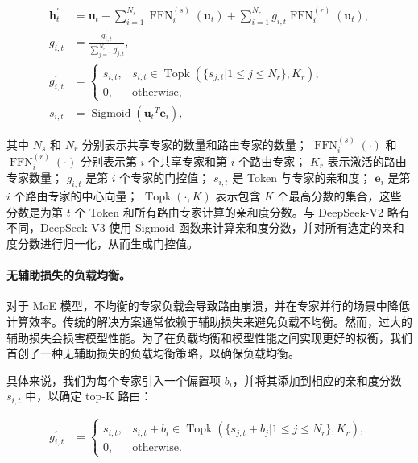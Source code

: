 \documentclass[lang=cn,a4paper,newtx]{elegantpaper}
\newcommand{\dsvii}{DeepSeek-V2}
\newcommand{\dsviii}{DeepSeek-V3}
\begin{document}
\begin{align}
    \mathbf{h}_{t}^{\prime} & = \mathbf{u}_{t} + \sum_{i=1}^{N_{s}} {\operatorname{FFN}^{(s)}_{i}\left( \mathbf{u}_{t} \right)} + \sum_{i=1}^{N_r} {g_{i,t} \operatorname{FFN}^{(r)}_{i}\left( \mathbf{u}_{t} \right)}, \\
    g_{i,t} & = \frac{g^{\prime}_{i,t}}{\sum_{j=1}^{N_r} g^{\prime}_{j,t}}, \\
    g^{\prime}_{i,t} & = \begin{cases} 
    s_{i,t}, & s_{i,t} \in \operatorname{Topk} (\{ s_{j, t} | 1 \leq j \leq N_r \}, K_{r}), \\
    0, & \text{otherwise}, 
    \end{cases} \\
    s_{i,t} & = \operatorname{Sigmoid} \left( {\mathbf{u}_{t}}^{T} \mathbf{e}_{i} \right),
\end{align}

其中 $N_{s}$ 和 $N_r$ 分别表示共享专家的数量和路由专家的数量； $\operatorname{FFN}^{(s)}_{i}(\cdot)$ 和 $\operatorname{FFN}^{(r)}_{i}(\cdot)$ 分别表示第 $i$ 个共享专家和第 $i$ 个路由专家； $K_{r}$ 表示激活的路由专家数量； $g_{i,t}$ 是第 $i$ 个专家的门控值； $s_{i,t}$ 是 Token 与专家的亲和度； $\mathbf{e}_{i}$ 是第 $i$ 个路由专家的中心向量； $\operatorname{Topk}(\cdot, K)$ 表示包含 $K$ 个最高分数的集合，这些分数是为第 $t$ 个 Token 和所有路由专家计算的亲和度分数。与 \dsvii{} 略有不同，\dsviii{} 使用 Sigmoid 函数来计算亲和度分数，并对所有选定的亲和度分数进行归一化，从而生成门控值。

\paragraph{无辅助损失的负载均衡。}
对于 MoE 模型，不均衡的专家负载会导致路由崩溃，并在专家并行的场景中降低计算效率。传统的解决方案通常依赖于辅助损失来避免负载不均衡。然而，过大的辅助损失会损害模型性能。为了在负载均衡和模型性能之间实现更好的权衡，我们首创了一种无辅助损失的负载均衡策略，以确保负载均衡。

具体来说，我们为每个专家引入一个偏置项 $b_i$，并将其添加到相应的亲和度分数 $s_{i,t}$ 中，以确定 top-K 路由：

\begin{align}
    g^{\prime}_{i,t} & = \begin{cases} 
    s_{i,t}, & s_{i,t} + b_i \in \operatorname{Topk} (\{ s_{j, t} + b_j | 1 \leq j \leq N_r \}, K_{r}), \\
    0, & \text{otherwise}.
    \end{cases}
\end{align}
\end{document}
